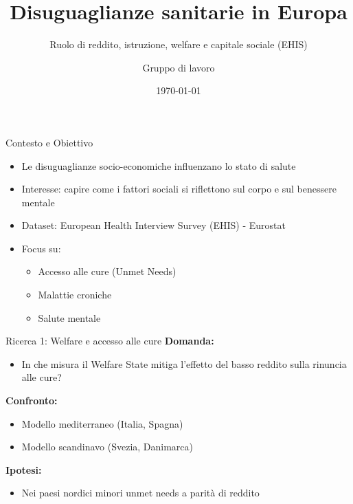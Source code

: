 \documentclass{beamer}
\title{Disuguaglianze sanitarie in Europa}
\subtitle{Ruolo di reddito, istruzione, welfare e capitale sociale (EHIS)}
\author{Gruppo di lavoro}
\date{\today}
\begin{document}
	
	\begin{frame}
		\titlepage
	\end{frame}
	
	\begin{frame}{Contesto e Obiettivo}
		\begin{itemize}
			\item Le disuguaglianze socio-economiche influenzano lo stato di salute
			\item Interesse: capire come i fattori sociali si riflettono sul corpo e sul benessere mentale
			\item Dataset: European Health Interview Survey (EHIS) - Eurostat
			\item Focus su:
			\begin{itemize}
				\item Accesso alle cure (Unmet Needs)
				\item Malattie croniche
				\item Salute mentale
			\end{itemize}
		\end{itemize}
	\end{frame}
	
	\begin{frame}{Ricerca 1: Welfare e accesso alle cure}
		\textbf{Domanda:}
		\begin{itemize}
			\item In che misura il Welfare State mitiga l'effetto del basso reddito sulla rinuncia alle cure?
		\end{itemize}
		
		\vspace{0.3cm}
		\textbf{Confronto:}
		\begin{itemize}
			\item Modello mediterraneo (Italia, Spagna)
			\item Modello scandinavo (Svezia, Danimarca)
		\end{itemize}
		
		\vspace{0.3cm}
		\textbf{Ipotesi:}
		\begin{itemize}
			\item Nei paesi nordici minori unmet needs a parità di reddito
		\end{itemize}
	\end{frame}
	
\end{document}
